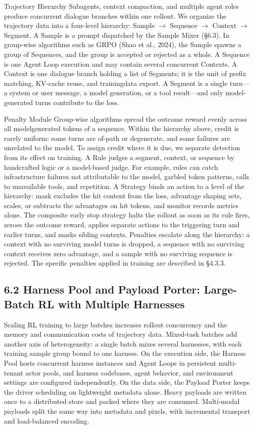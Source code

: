 \documentclass[
  10
]{article}
\begin{document}
Trajectory Hierarchy Subagents, context compaction, and multiple agent
roles produce concurrent dialogue branches within one rollout. We
organize the trajectory data into a four-level hierarchy: Sample $\to$
Sequence $\to$ Context $\to$ Segment. A Sample is a prompt dispatched by the
Sample Mixer (§6.3). In group-wise algorithms such as GRPO (Shao et al.,
2024), the Sample spawns a group of Sequences, and the group is accepted
or rejected as a whole. A Sequence is one Agent Loop execution and may
contain several concurrent Contexts. A Context is one dialogue branch
holding a list of Segments; it is the unit of prefix matching, KV-cache
reuse, and trainingdata export. A Segment is a single turn---a system or
user message, a model generation, or a tool result---and only
model-generated turns contribute to the loss.

Penalty Module Group-wise algorithms spread the outcome reward evenly
across all modelgenerated tokens of a sequence. Within the hierarchy
above, credit is rarely uniform: some turns are of-path or degenerate,
and some failures are unrelated to the model. To assign credit where it
is due, we separate detection from its effect on training. A Rule judges
a segment, context, or sequence by handcrafted logic or a model-based
judge. For example, rules can catch infrastructure failures not
attributable to the model, garbled token patterns, calls to unavailable
tools, and repetition. A Strategy binds an action to a level of the
hierarchy: mask excludes the hit content from the loss, advantage
shaping sets, scales, or subtracts the advantages on hit tokens, and
monitor records metrics alone. The composite early stop strategy halts
the rollout as soon as its rule fires, zeroes the outcome reward,
applies separate actions to the triggering turn and earlier turns, and
masks sibling contexts. Penalties escalate along the hierarchy: a
context with no surviving model turns is dropped, a sequence with no
surviving context receives zero advantage, and a sample with no
surviving sequence is rejected. The specific penalties applied in
training are described in §4.3.3.

\subsection{6.2 Harness Pool and Payload Porter: Large-Batch RL with
Multiple
Harnesses}\label{harness-pool-and-payload-porter-large-batch-rl-with-multiple-harnesses}

Scaling RL training to large batches increases rollout concurrency and
the memory and communication costs of trajectory data. Mixed-task
batches add another axis of heterogeneity: a single batch mixes several
harnesses, with each training sample group bound to one harness. On the
execution side, the Harness Pool hosts concurrent harness instances and
Agent Loops in persistent multi-tenant actor pools, and harness
codebases, agent behavior, and environment settings are configured
independently. On the data side, the Payload Porter keeps the driver
scheduling on lightweight metadata alone. Heavy payloads are written
once to a distributed store and packed where they are consumed.
Multi-modal payloads split the same way into metadata and pixels, with
incremental transport and load-balanced encoding.
\end{document}
